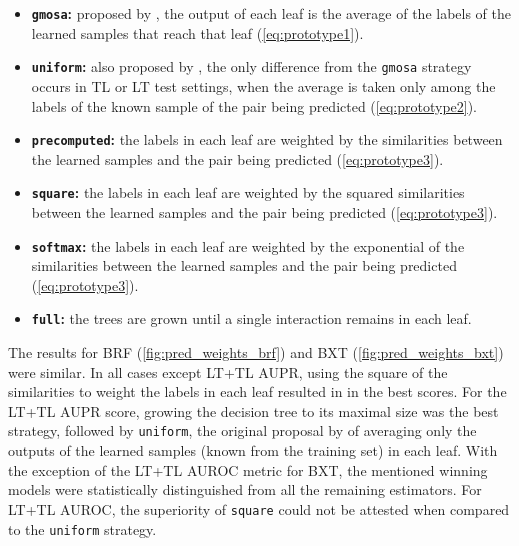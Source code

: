 \begin{itemize}
    \item \textbf{\texttt{gmosa}:} proposed by , the output of each leaf is the average of the labels of the learned samples that reach that leaf (\autoref{eq:prototype1}).
    \item \textbf{\texttt{uniform}:} also proposed by , the only difference from the \texttt{gmosa} strategy occurs in TL or LT test settings, when the average is taken only among the labels of the known sample of the pair being predicted (\autoref{eq:prototype2}).
    \item \textbf{\texttt{precomputed}:}
    the labels in each leaf are weighted by the similarities between the learned samples and the pair being predicted (\autoref{eq:prototype3}).
    \item \textbf{\texttt{square}:} the labels in each leaf are weighted by the squared similarities between the learned samples and the pair being predicted (\autoref{eq:prototype3}).
    \item \textbf{\texttt{softmax}:} the labels in each leaf are weighted by the exponential of the similarities between the learned samples and the pair being predicted (\autoref{eq:prototype3}).
    \item \textbf{\texttt{full}:} the trees are grown until a single interaction remains in each leaf. %
\end{itemize}


The results for BRF (\autoref{fig:pred_weights_brf}) and BXT (\autoref{fig:pred_weights_bxt}) were similar. In all cases except LT+TL AUPR, using the square of the similarities to weight the labels in each leaf resulted in in the best scores. For the LT+TL AUPR score, growing the decision tree to its maximal size was the best strategy, followed by \texttt{uniform}, the original proposal by  of averaging only the 
outputs of the learned samples (known from the training set) in each leaf. With the exception of the LT+TL AUROC metric for BXT, the mentioned winning models were statistically distinguished from all the remaining estimators. For LT+TL AUROC, the superiority of \texttt{square} could not be attested when compared to the \texttt{uniform} strategy.

